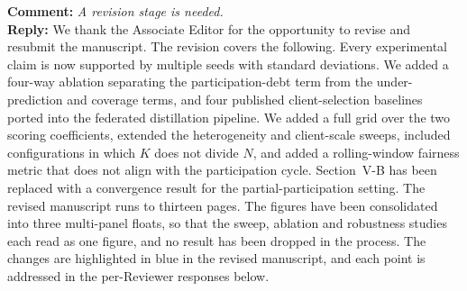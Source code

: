 \documentclass[10pt]{article}
\begin{document}
\noindent
\textbf{Comment:} \textit{A revision stage is needed.}\\
\noindent
\textbf{Reply:} {We thank the Associate Editor for the opportunity to revise and resubmit the manuscript. The revision covers the following. Every experimental claim is now supported by multiple seeds with standard deviations. We added a four-way ablation separating the participation-debt term from the under-prediction and coverage terms, and four published client-selection baselines ported into the federated distillation pipeline. We added a full grid over the two scoring coefficients, extended the heterogeneity and client-scale sweeps, included configurations in which $K$ does not divide $N$, and added a rolling-window fairness metric that does not align with the participation cycle. Section~V-B has been replaced with a convergence result for the partial-participation setting. The revised manuscript runs to thirteen pages. The figures have been consolidated into three multi-panel floats, so that the sweep, ablation and robustness studies each read as one figure, and no result has been dropped in the process. The changes are highlighted in blue in the revised manuscript, and each point is addressed in the per-Reviewer responses below.}\\

\end{document}
